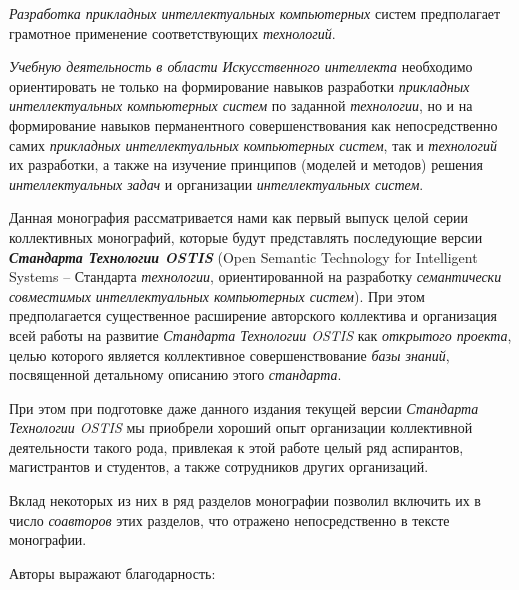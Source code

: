 \begin{SCn}
{	\textit{Разработка прикладных интеллектуальных компьютерных} систем  предполагает грамотное применение соответствующих \textit{технологий}.
	
	
	\textit{Учебную деятельность в области Искусственного интеллекта} необходимо ориентировать не только на формирование навыков разработки \textit{прикладных интеллектуальных компьютерных систем} по заданной \textit{технологии}, но и на формирование навыков перманентного совершенствования как непосредственно самих \textit{прикладных интеллектуальных компьютерных систем}, так и \textit{технологий} их разработки, а также на изучение принципов (моделей и методов) решения \textit{интеллектуальных задач} и организации \textit{интеллектуальных систем}.



Данная монография рассматривается нами как первый выпуск целой серии коллективных монографий, которые будут представлять последующие версии \textbf{\textit{Стандарта Технологии OSTIS}} (Open Semantic Technology for Intelligent Systems -- Стандарта \textit{технологии}, ориентированной на разработку \textit{семантически совместимых интеллектуальных компьютерных систем}). При этом предполагается существенное расширение авторского коллектива и организация всей работы на развитие \textit{Стандарта Технологии OSTIS} как \textit{открытого проекта}, целью которого является коллективное совершенствование \textit{базы знаний}, посвященной детальному описанию этого \textit{стандарта}.

При этом при подготовке даже данного издания текущей версии \textit{Стандарта Технологии OSTIS} мы приобрели хороший опыт организации коллективной деятельности такого рода, привлекая к этой работе целый ряд аспирантов, магистрантов и студентов, а также сотрудников других организаций.

Вклад некоторых из них в ряд разделов монографии позволил включить их в число \textit{соавторов} этих разделов, что отражено непосредственно в тексте монографии.

Авторы выражают благодарность:

}
\end{SCn}
